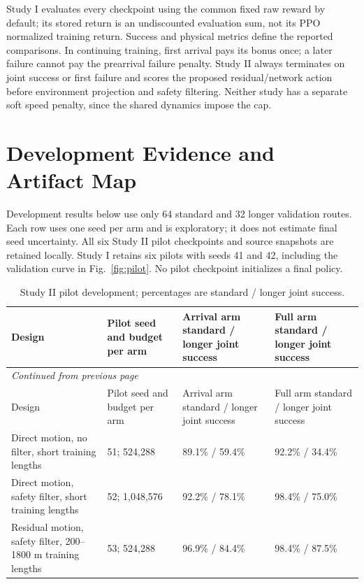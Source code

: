 Study I evaluates every checkpoint using the common fixed raw reward by default;
its stored return is an undiscounted evaluation sum, not its PPO normalized
training return. Success and physical metrics define the reported comparisons.
In continuing training, first arrival pays its bonus once; a later failure
cannot pay the prearrival failure penalty. Study II always terminates on joint
success or first failure and scores the proposed residual/network action before
environment projection and safety filtering. Neither study has a separate soft
speed penalty, since the shared dynamics impose the cap.

\clearpage
\section{Development Evidence and Artifact Map}
\label{app:development}
Development results below use only 64 standard and 32 longer validation routes.
Each row uses one seed per arm and is exploratory; it does not estimate final
seed uncertainty. All six Study II pilot checkpoints and source snapshots are
retained locally. Study I retains six pilots with seeds 41 and 42, including
the validation curve in Fig.~\ref{fig:pilot}. No pilot checkpoint initializes a
final policy.

{\footnotesize\setlength{\tabcolsep}{3pt}
\begin{longtable}{@{}p{}p{}p{}p{}@{}}
\caption{Study II pilot development; percentages are standard / longer joint success.}\label{tab:development}\\
\toprule Design & Pilot seed and budget per arm & Arrival arm standard / longer joint success & Full arm standard / longer joint success\\\midrule
\endfirsthead
\multicolumn{4}{l}{\textit{Continued from previous page}}\\\toprule
Design & Pilot seed and budget per arm & Arrival arm standard / longer joint success & Full arm standard / longer joint success\\\midrule
\endhead
\bottomrule\endfoot
Direct motion, no filter, short training lengths & 51; 524,288 & 89.1\% / 59.4\% & 92.2\% / 34.4\%\\
Direct motion, safety filter, short training lengths & 52; 1,048,576 & 92.2\% / 78.1\% & 98.4\% / 75.0\%\\
Residual motion, safety filter, 200--1800 m training lengths & 53; 524,288 & 96.9\% / 84.4\% & 98.4\% / 87.5\%\\
\end{longtable}}

